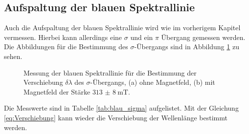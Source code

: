 \subsection{Aufspaltung der blauen Spektrallinie}
Auch die Aufspaltung der blauen Spektrallinie wird wie im vorherigem Kapitel vermessen.
Hierbei kann allerdings eine $\sigma$ und ein $\pi$ Übergang gemessen werden.
Die Abbildungen für die Bestimmung des $\sigma$-Übergangs sind in Abbildung \ref{fig:blau_sigma} zu sehen.
\FloatBarrier
\begin{figure}
    \centering
    \vspace{0.1\textwidth}
    \caption{Messung der blauen Spektrallinie für die Bestimmung der Verschiebung $\delta \lambda$ des $\sigma$-Übergangs, (a) ohne Magnetfeld, (b) mit Magnetfeld der Stärke $\SI{313(8)}{\milli\tesla}$.}
    \label{fig:blau_sigma}
\end{figure}
\FloatBarrier
Die Messwerte sind in Tabelle \ref{tab:blau_sigma} aufgelistet. Mit der Gleichung \eqref{eq:Verschiebung} kann wieder
die Verschiebung der Wellenlänge bestimmt werden.
\FloatBarrier
